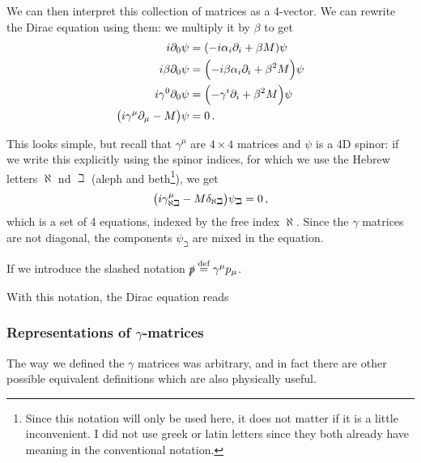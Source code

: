 \documentclass[main.tex]{subfiles}
\begin{document}
We can then interpret this collection of matrices as a 4-vector. 
We can rewrite the Dirac equation using them: we multiply it by \(\beta \) to get 
%
\begin{subequations}
\begin{align}
i \partial_0 \psi &= \qty(-i \alpha_{i} \partial_{i}+ \beta M ) \psi  \\
i \beta \partial_0 \psi &= \qty(-i \beta \alpha_{i} \partial_{i} + \beta^2 M) \psi  \\
i \gamma^{0} \partial_0 \psi &= \qty(- \gamma^{i}\partial_{i} + \beta^2 M) \psi  \\
\qty(i \gamma^{\mu } \partial_{\mu } - M ) \psi &= 0 
\,.
\end{align}
\end{subequations}

This looks simple, but recall that \(\gamma^{\mu }\) are \(4 \times 4\) matrices and \(\psi \) is a 4D spinor: if we write this explicitly using the spinor indices, for which we use the Hebrew letters \(\aleph\) nd \(\beth\) (aleph and beth\footnote{Since this notation will only be used here, it does not matter if it is a little inconvenient. I did not use greek or latin letters since they both already have meaning in the conventional notation.}), we get 
%
\begin{align}
\qty(i \gamma^{\mu }_{\aleph \beth} - M \delta_{\aleph \beth}) \psi_{\beth} = 0 
\,,
\end{align}
%
which is a set of 4 equations, indexed by the free index \(\aleph\).
Since the \(\gamma \) matrices are not diagonal, the components \(\psi_{\beth}\) are mixed in the equation. 

If we introduce the slashed notation \(\slashed{p} \overset{\text{def}}{=} \gamma^{\mu }p_{\mu }\). 

With this notation, the Dirac equation reads 
%

\subsubsection{Representations of \(\gamma \)-matrices}

The way we defined the \(\gamma \) matrices was arbitrary, and in fact there are other possible equivalent definitions which are also physically useful. 
\end{document}
